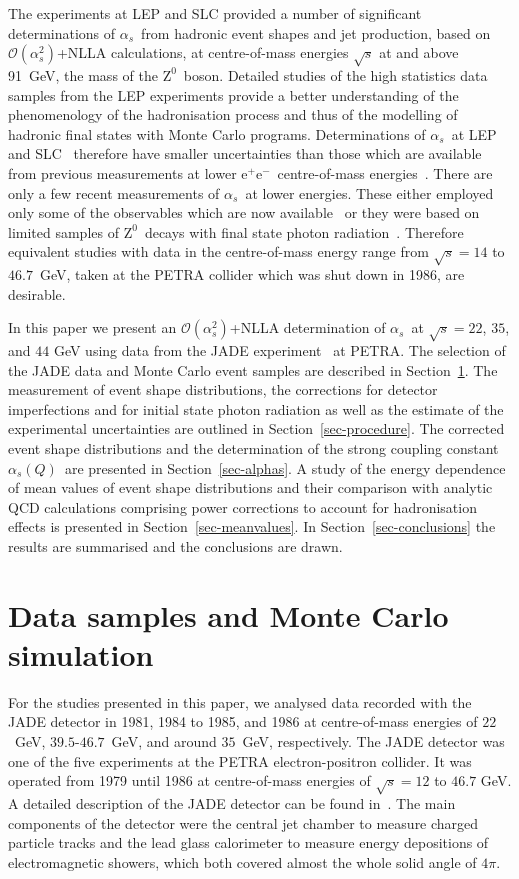 \documentclass[12pt,a4paper,twoside]{article}
\newcommand{\epem}   {\ensuremath{\mathrm{e^+e^-}}}
\newcommand{\as}     {\ensuremath{\alpha_s}}
\newcommand{\asq}    {\ensuremath{\alpha_s(Q)}}
\newcommand{\oaa}    {\ensuremath{\mathcal{O}(\alpha_s^2)}}
\newcommand{\znull}  {\ensuremath{\mathrm{Z^0}}}
\newcommand{\zzero}  {\ensuremath{\mathrm{Z^0}}}
\begin{document}
The experiments at LEP and SLC provided a number of significant 
determinations of \as\ from hadronic event shapes and jet 
production, based on \oaa+NLLA calculations,
at centre-of-mass energies $\sqrt{s}$ at and above 91~GeV, the mass 
of the \zzero\ boson.
Detailed studies of the high statistics data samples from
the LEP experiments provide a better understanding of the
phenomenology of the hadronisation process and thus of the modelling
of hadronic final states with Monte Carlo programs.
Determinations of \as\ 
at LEP and 
SLC~\cite{bib-ALEPHalphas,bib-DELPHIalphas,bib-L3alphas,bib-OPALresummed,bib-SLDalphas}
therefore have smaller uncertainties than those which are available from 
previous measurements at lower \epem\ centre-of-mass 
energies~\cite{bib-naroska,bib-sb-budapest}.
There are only a few recent measurements of \as\ at lower energies. 
These either 
employed only some of the observables 
which are now available~\cite{bib-TPC2gamma,bib-TOPAZ} or they
were based on limited
samples of \znull\ decays with final state 
photon radiation~\cite{bib-L3-FSR}. 
Therefore equivalent studies with data in the 
centre-of-mass energy range from 
$\sqrt{s} = 14$ to $46.7$~GeV, taken at the PETRA collider which was
shut down in 1986, are desirable.

In this paper we present an \oaa+NLLA determination of \as\ at $\sqrt{s} =
22$,  $35$, and
$44$ GeV using data from the JADE experiment~\cite{bib-naroska,bib-JADEdet} at 
PETRA. 
The selection of the JADE data and Monte Carlo event samples 
are described in Section~\ref{sec-data}. 
The measurement of event shape distributions, the
corrections for detector imperfections and for initial state
photon radiation as well as the estimate of the experimental uncertainties
are outlined in Section~\ref{sec-procedure}. 
The corrected event shape distributions and the determination
of the strong  coupling constant \asq\ 
are presented in Section~\ref{sec-alphas}.
A study of the energy dependence of mean values of event shape
distributions and their comparison with analytic QCD calculations comprising
power corrections to account for hadronisation effects
is presented in Section~\ref{sec-meanvalues}.
In Section~\ref{sec-conclusions} the results are summarised and the 
conclusions are drawn.
  
\section{ Data samples and Monte Carlo simulation }
\label{sec-data}
For the studies presented in this paper, we analysed 
data recorded with the JADE detector in 1981, 1984 to 1985, and 1986 at 
centre-of-mass 
energies of $22$~GeV, $39.5$-$46.7$~GeV, and around $35$~GeV,
respectively. 
The JADE detector was one of the five experiments at the 
PETRA electron-positron
collider. 
It was operated from 1979 until 1986 at centre-of-mass energies of
$\sqrt{s} = 12$ to $46.7$ GeV. 
A detailed description of the JADE detector can be found
in~\cite{bib-naroska,bib-JADEdet}. 
The main components of the detector were the
central jet chamber to measure charged particle tracks
and the lead glass calorimeter to measure energy depositions of
electromagnetic showers, which both
covered almost the whole
solid angle of $4\pi$. 
\end{document}
